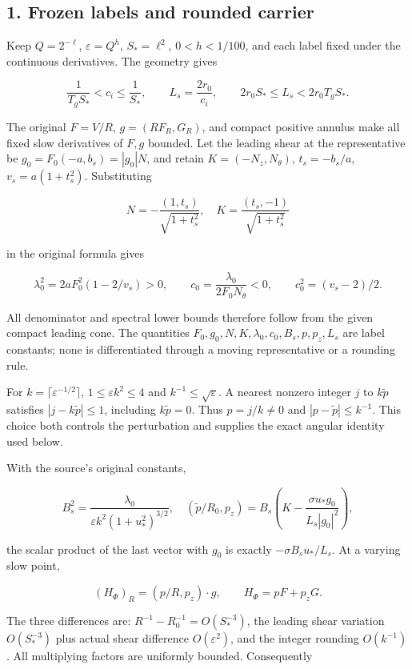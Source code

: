 \documentclass[10pt,a4paper]{article}
\newcounter{none}
\begin{document}
\subsection{1. Frozen labels and rounded carrier}\label{gclosure:frozen-labels-and-rounded-carrier}

Keep \(Q=2^{-\ell}\), \(\varepsilon=Q^h\), \(S_*=\ell^2\), \(0<h<1/100\), and each label fixed under the continuous derivatives. The geometry gives

\[
\frac1{T_gS_*}<c_i\le\frac1{S_*},\qquad
L_s=\frac{2r_0}{c_i},\qquad
2r_0S_*\le L_s<2r_0T_gS_*.
\]

The original \(F=V/R\), \(g=(RF_R,G_R)\), and compact positive annulus make all fixed slow derivatives of \(F,g\) bounded. Let the leading shear at the representative be \(g_0=F_0(-a,b_s)=|g_0|N\), and retain \(K=(-N_z,N_\theta)\), \(t_s=-b_s/a\), \(v_s=a(1+t_s^2)\). Substituting

\[
N=-\frac{(1,t_s)}{\sqrt{1+t_s^2}},\quad
K=\frac{(t_s,-1)}{\sqrt{1+t_s^2}}
\]

in the original formula gives

\[
\lambda_0^2=2aF_0^2(1-2/v_s)>0,\qquad
c_0=\frac{\lambda_0}{2F_0N_\theta}<0,\qquad c_0^2=(v_s-2)/2.
\]

All denominator and spectral lower bounds therefore follow from the given compact leading cone. The quantities \(F_0,g_0,N,K,\lambda_0,c_0,B_s,p,p_z,L_s\) are label constants; none is differentiated through a moving representative or a rounding rule.

For \(k=\lceil\varepsilon^{-1/2}\rceil\), \(1\le\varepsilon k^2\le4\) and \(k^{-1}\le\sqrt\varepsilon\). A nearest nonzero integer \(j\) to \(k\widetilde p\) satisfies \(|j-k\widetilde p|\le1\), including \(k\widetilde p=0\). Thus \(p=j/k\ne0\) and \(|p-\widetilde p|\le k^{-1}\). This choice both controls the perturbation and supplies the exact angular identity used below.

With the source's original constants,

\[
B_s^2=\frac{\lambda_0}{\varepsilon k^2(1+u_*^2)^{3/2}},\quad
(\widetilde p/R_0,p_z)=B_s\left(K-\frac{\sigma u_*g_0}{L_s|g_0|^2}\right),
\]

the scalar product of the last vector with \(g_0\) is exactly \(-\sigma B_su_*/L_s\). At a varying slow point,

\[
(H_\Phi)_R=(p/R,p_z)\cdot g,\qquad H_\Phi=pF+p_zG.
\]

The three differences are: \(R^{-1}-R_0^{-1}=O(S_*^{-3})\), the leading shear variation \(O(S_*^{-3})\) plus actual shear difference \(O(\varepsilon^2)\), and the integer rounding \(O(k^{-1})\). All multiplying factors are uniformly bounded. Consequently
\end{document}
